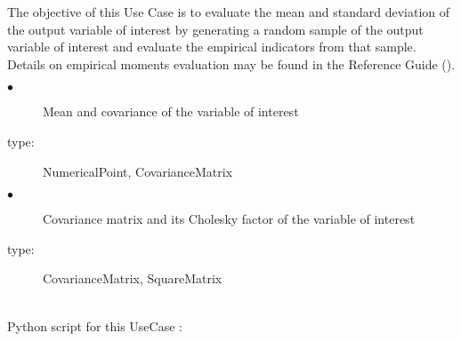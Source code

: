 \renewcommand{\filename}{docUC_CentralUncertainty_MomentsEvaluation.tex}
\renewcommand{\filetitle}{UC : Moments evaluation of a random sample of the output variable of interest}

\HeaderIIILevel





The objective of this Use Case  is to evaluate the mean and standard deviation of the output variable of interest by generating a random sample of the output variable of interest and evaluate the empirical indicators from that sample.\\

Details on empirical moments evaluation  may be found in the Reference Guide ().\\

             {
               \begin{description}
               \item[$\bullet$] Mean and covariance of the variable of interest
               \item[type:] NumericalPoint, CovarianceMatrix
               \end{description}

               \begin{description}
               \item[$\bullet$] Covariance matrix and its Cholesky factor of the variable of interest
               \item[type:] CovarianceMatrix, SquareMatrix
               \end{description}
             }

             \textspace\\
             Python script for this UseCase :

